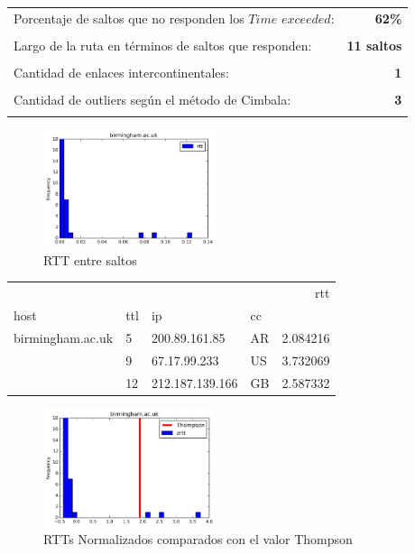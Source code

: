 \begin{center}
\begin{tabular}{p{6.5cm}r}
Porcentaje de saltos que no responden los $Time$ $exceeded$: & \textbf{62\%} \\ \\ 
Largo de la ruta en términos de saltos que responden: &\textbf{11 saltos} \\ \\
Cantidad de enlaces intercontinentales: & \textbf{1} \\ \\
Cantidad de outliers según el método de Cimbala: & \textbf{3} \\ \\
\end{tabular}
\end{center}

\begin{figure}[H]
  \centering
    \includegraphics[width=0.45\textwidth]{histogramas_rtt/birmingham-ac-uk.png}
  \caption{RTT entre saltos}
  \label{entropia-s}
\end{figure}

\begin{center}
\begin{tabular}{llllr}
\toprule
                 &    &             &    &       rtt \\
host & ttl & ip & cc &           \\
\midrule
birmingham.ac.uk & 5  & 200.89.161.85 & AR &  2.084216 \\
                 & 9  & 67.17.99.233 & US &  3.732069 \\
                 & 12 & 212.187.139.166 & GB &  2.587332 \\
\bottomrule
\end{tabular}

\end{center}

\begin{figure}[H]
  \centering
    \includegraphics[width=0.45\textwidth]{histogramas_thompson/birmingham-ac-uk.png}
  \caption{RTTs Normalizados comparados con el valor Thompson}
  \label{entropia-s}
\end{figure}

